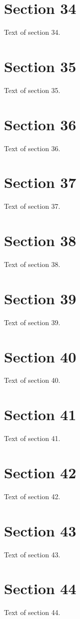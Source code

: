 \documentclass{article}
\begin{document}
\section{Section 34}
Text of section 34.

\section{Section 35}
Text of section 35.

\section{Section 36}
Text of section 36.

\section{Section 37}
Text of section 37.

\section{Section 38}
Text of section 38.

\section{Section 39}
Text of section 39.

\section{Section 40}
Text of section 40.

\section{Section 41}
Text of section 41.

\section{Section 42}
Text of section 42.

\section{Section 43}
Text of section 43.

\section{Section 44}
Text of section 44.
\end{document}
